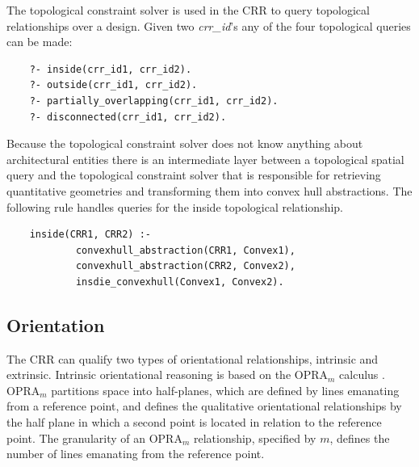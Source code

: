 \documentclass[12pt]{ucthesis}
\begin{document}
The topological constraint solver is used in the CRR to query topological relationships over a design. Given two \emph{crr\_id}'s any of the four topological queries can be made: 
\begin{verbatim}
    ?- inside(crr_id1, crr_id2).
    ?- outside(crr_id1, crr_id2).
    ?- partially_overlapping(crr_id1, crr_id2).
    ?- disconnected(crr_id1, crr_id2).
\end{verbatim}Because the topological constraint solver does not know anything about architectural entities there is an intermediate layer between a topological spatial query and the topological constraint solver that is responsible for retrieving quantitative geometries and transforming them into convex hull abstractions. The following rule handles queries for the inside topological relationship.
\begin{verbatim}
    inside(CRR1, CRR2) :-
            convexhull_abstraction(CRR1, Convex1),
            convexhull_abstraction(CRR2, Convex2),
            insdie_convexhull(Convex1, Convex2).
\end{verbatim}



\subsection{Orientation} \label{orientation}
The CRR can qualify two types of orientational relationships, intrinsic and extrinsic. Intrinsic orientational reasoning is based on the OPRA$_{m}$ calculus \cite{opra}. OPRA$_{m}$ partitions space into half-planes, which are defined by lines emanating from a reference point, and defines the qualitative orientational relationships by the half plane in which a second point is located in relation to the reference point. The granularity of an OPRA$_{m}$ relationship, specified by $m$, defines the number of lines emanating from the reference point. 
\end{document}
